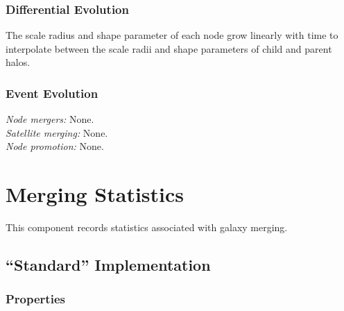 \subsubsection{Differential Evolution}

The scale radius and shape parameter of each node grow linearly with time to interpolate between the scale radii and shape parameters of child and parent halos.

\subsubsection{Event Evolution}

\noindent\emph{Node mergers:} None.\\

\noindent\emph{Satellite merging:} None.\\

\noindent\emph{Node promotion:} None.\\


\section{Merging Statistics}

This \gls{component} records statistics associated with galaxy merging.

\subsection{``Standard'' Implementation}

\subsubsection{Properties}

